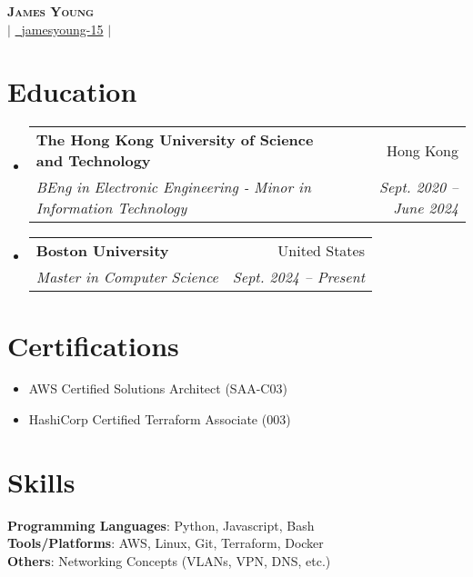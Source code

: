 \documentclass[letterpaper,12pt]{article}
\makeatletter
\newcommand{\resumeSubheading}[4]{
  \vspace{-1pt}\item
    \begin{tabular*}{0.98\textwidth}[t]{l@{\extracolsep{\fill}}r}
      \textbf{#1} & #2 \\
      \textit{\small#3} & \textit{\small #4} \\
    \end{tabular*}\vspace{-7pt}
}
\newcommand{\resumeSubHeadingListStart}{\begin{itemize}[leftmargin=0.05in, label={}]}
\newcommand{\resumeSubHeadingListEnd}{\end{itemize}}
\makeatother
\begin{document}
\begin{center}
    \textbf{\Huge \scshape James Young} \\ \vspace{3pt}
    \href{mailto:jyyoung@bu.edu}{} $|$ 
    \href{https://github.com/jamesyoung-15} {\faGithub\ {jamesyoung-15}} $|$
    \href{https://linkedin.com/in/jamesyyoung}{}
\end{center}


\section{Education}
  \resumeSubHeadingListStart
    \resumeSubheading
      {The Hong Kong University of Science and Technology}{Hong Kong}
      {BEng in Electronic Engineering - Minor in Information Technology}{Sept. 2020 -- June 2024}
  \resumeSubHeadingListEnd
  \vspace{-7pt}
  \resumeSubHeadingListStart
    \resumeSubheading
      {Boston University}{United States}
      {Master in Computer Science}{Sept. 2024 -- Present}
  \resumeSubHeadingListEnd
\vspace{-10pt}

\section{Certifications}
\vspace{-15pt} %
\vspace{1pt}
    \begin{multicols}{2}
        \begin{itemize}[itemsep=-1pt, parsep=3pt, leftmargin=0.22in]
        \small
            \item AWS Certified Solutions Architect (SAA-C03)
            \item HashiCorp Certified Terraform Associate (003)
        \end{itemize}
    \end{multicols}

\section{Skills}
 \begin{itemize}[leftmargin=0.05in, label={}]
    \small{\item{
     \textbf{Programming Languages}{: Python, Javascript, Bash} \\
     \textbf{Tools/Platforms}{: AWS, Linux, Git, Terraform, Docker} \\ 
     \textbf{Others}{: Networking Concepts (VLANs, VPN, DNS, etc.)} \\
    }}
 \end{itemize}
\end{document}
